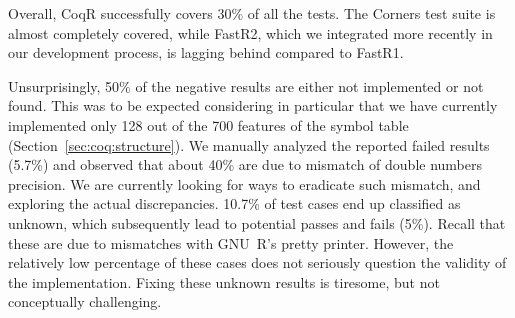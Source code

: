 \documentclass[
    sigplan,
    10pt,
    review, %
    natbib=false %
 ]{acmart}
\newcommand\et[1]{\todo[color=blue!20,size=\scriptsize]{#1}}
\newcommand\td[1]{\todo[color=green!20,size=\scriptsize]{#1}}
\newcommand\CoqR{CoqR}
\begin{document}
Overall, \CoqR{} successfully covers 30\% of all the tests. The Corners test suite is almost completely covered, while FastR2, which we integrated more recently in our development process, is lagging behind compared to FastR1.

Unsurprisingly, 50\% of the negative results are either \textsf{not implemented} or \textsf{not found}. This was to be expected considering in particular that we have currently implemented only 128 out of the 700 features of the symbol table (Section~\ref{sec:coq:structure}).
%
We manually analyzed the reported failed results (5.7\%) and observed that about 40\% are due to mismatch of double numbers precision. We are currently looking for ways to eradicate such mismatch, and exploring the actual discrepancies.
%
10.7\% of test cases end up classified as \textsf{unknown}, which subsequently lead to potential passes and fails (5\%).
Recall that these are due to mismatches with GNU~R's pretty printer. However, the relatively low percentage of these cases does not seriously question the validity of the implementation. Fixing these unknown results is tiresome, but not conceptually challenging.

\end{document}
